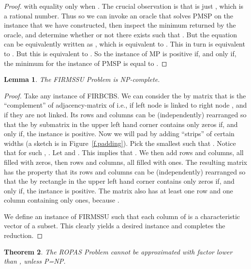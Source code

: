 \documentclass[letterpaper,11pt]{article}
\newtheorem{theorem}{Theorem}[section]
\newtheorem{lemma}[theorem]{Lemma}
\begin{document}
{\begin{proof}
with equality only when . The crucial observation is that  is just , which is a rational number. Thus so we can invoke an oracle that solves PMSP on the instance that we have constructed, then inspect the minimum returned by the oracle, and determine whether or not there exists  such that . But the equation can be equivalently written as
, which is equivalent to . This in turn is equivalent to . But this is equivalent to 
. So 
the instance of MP is positive if, and only if, the minimum for the instance of PMSP is equal to 
.
\end{proof}


\renewcommand{\thetheorem}{4.5}

\begin{lemma}
The FIRMSSU Problem is NP-complete.
\end{lemma}

\begin{proof}
Take any instance of FIRBCBS. We can consider the  by  matrix  that is the ``complement'' of adjacency-matrix of  i.e.,  if left node  is linked to right node , and  if they are not linked. Its rows and columns can be (independently) rearranged so that the  by  submatrix in the upper left hand corner contains only zeros if, and only if, the instance is positive. 
Now we will pad  by adding ``strips'' of certain widths (a sketch is in Figure~\ref{f.padding}). Pick the smallest  such that . Notice that for such , . Let  and . This implies that . We then add  rows and  columns, all filled with zeros, then  rows and  columns, all filled with ones. 
The resulting matrix  has the property that its rows and columns can be (independently) rearranged so that the  by  rectangle in the upper left hand corner contains only zeros if, and only if, the instance is positive. The matrix also has at least one row and one column containing only ones, because .


We define an instance of FIRMSSU such that each column of  is a characteristic vector of a subset. This clearly yields a desired instance and completes the reduction.
\end{proof}


\renewcommand{\thetheorem}{4.7}

\begin{theorem}
The ROPAS Problem cannot be approximated with factor lower than , unless P=NP.
\end{theorem}

}
\end{document}
